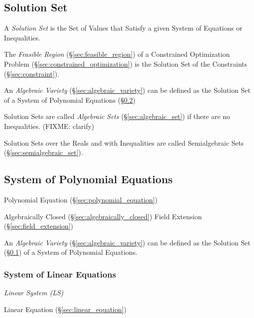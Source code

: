 \subsection{Solution Set}\label{sec:solution_set}

A \emph{Solution Set} is the Set of Values that Satisfy a given System of
Equations or Inequalities.

The \emph{Feasible Region} (\S\ref{sec:feasible_region}) of a Constrained
Optimization Problem (\S\ref{sec:constrained_optimization}) is the Solution Set
of the Constraints (\S\ref{sec:constraint}).

An \emph{Algebraic Variety} (\S\ref{sec:algebraic_variety}) can be defined as
the Solution Set of a System of Polynomial Equations
(\S\ref{sec:polynomial_equation_system})

Solution Sets are called \emph{Algebraic Sets} (\S\ref{sec:algebraic_set}) if
there are no Inequalities. (FIXME: clarify)

Solution Sets over the Reals and with Inequalities are called Semialgebraic
Sets (\S\ref{sec:semialgebraic_set}).



\subsection{System of Polynomial Equations}
\label{sec:polynomial_equation_system}

Polynomial Equation (\S\ref{sec:polynomial_equation})

Algebraically Closed (\S\ref{sec:algebraically_closed}) Field
Extension (\S\ref{sec:field_extension})

An \emph{Algebraic Variety} (\S\ref{sec:algebraic_variety}) can be defined as
the Solution Set (\S\ref{sec:solution_set}) of a System of Polynomial Equations.



\subsubsection{System of Linear Equations}\label{sec:linear_equation_system}

\emph{Linear System (LS)}

Linear Equation (\S\ref{sec:linear_equation})

